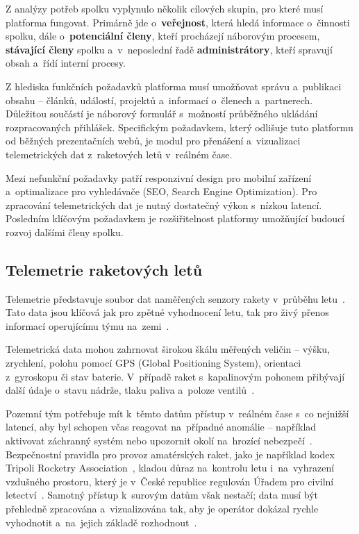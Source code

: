 Z analýzy potřeb spolku vyplynulo několik cílových skupin, pro které musí platforma fungovat. Primárně jde o~\textbf{veřejnost}, která hledá informace o~činnosti spolku, dále o~\textbf{potenciální členy}, kteří procházejí náborovým procesem, \textbf{stávající členy} spolku a~v~neposlední řadě \textbf{administrátory}, kteří spravují obsah a~řídí interní procesy.

Z hlediska funkčních požadavků platforma musí umožňovat správu a~publikaci obsahu -- článků, událostí, projektů a~informací o~členech a~partnerech. Důležitou součástí je náborový formulář s~možností průběžného ukládání rozpracovaných přihlášek. Specifickým požadavkem, který odlišuje tuto platformu od běžných prezentačních webů, je modul pro přenášení a~vizualizaci telemetrických dat z~raketových letů v~reálném čase.

Mezi nefunkční požadavky patří responzivní design pro mobilní zařízení a~optimalizace pro vyhledávače (SEO, Search Engine Optimization). Pro zpracování telemetrických dat je nutný dostatečný výkon s~nízkou latencí. Posledním klíčovým požadavkem je rozšiřitelnost platformy umožňující budoucí rozvoj dalšími členy spolku.

\subsection{Telemetrie raketových letů}
Telemetrie představuje soubor dat naměřených senzory rakety v~průběhu letu~\cite{lacek2019rocket}. Tato data jsou klíčová jak pro zpětné vyhodnocení letu, tak pro živý přenos informací operujícímu týmu na~zemi~\cite{nasa2023srhb}.

Telemetrická data mohou zahrnovat širokou škálu měřených veličin -- výšku, zrychlení, polohu pomocí GPS (Global Positioning System), orientaci z~gyroskopu či stav baterie. V~případě raket s~kapalinovým pohonem přibývají další údaje o~stavu nádrže, tlaku paliva a~poloze ventilů~\cite{lacek2019rocket}.

Pozemní tým potřebuje mít k~těmto datům přístup v~reálném čase s~co nejnižší latencí, aby byl schopen včas reagovat na~případné anomálie -- například aktivovat záchranný systém nebo upozornit okolí na~hrozící nebezpečí~\cite{kaknjo2019lowcost}. Bezpečnostní pravidla pro provoz amatérských raket, jako je například kodex Tripoli Rocketry Association~\cite{tripoli2025safety}, kladou důraz na~kontrolu letu i~na~vyhrazení vzdušného prostoru, který je v~České republice regulován Úřadem pro civilní letectví~\cite{caa2023lkr10}. Samotný přístup k~surovým datům však nestačí; data musí být přehledně zpracována a~vizualizována tak, aby je operátor dokázal rychle vyhodnotit a~na~jejich základě rozhodnout~\cite{nasa2023srhb}.


